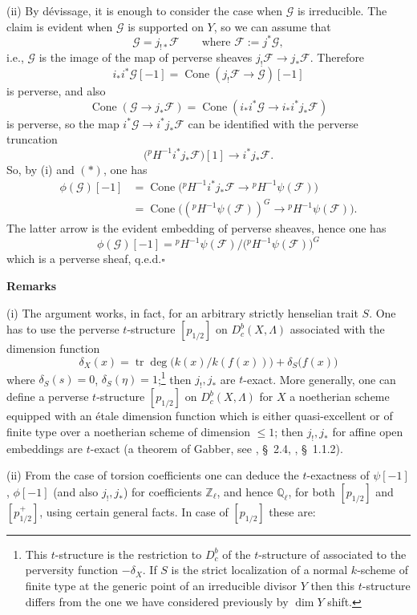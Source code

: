 \documentclass[12pt,oneside]{amsbook}
\theoremstyle{plain}
\theoremstyle{definition}
\newcommand{\FF}{\mathcal{F}}
\newcommand{\GG}{\mathcal{G}}
\newcommand{\Zl}{\mathbb{Z}_{\ell}}
\newcommand{\Ql}{\mathbb{Q}_{\ell}}
\newcommand{\Dbc}{D^{b}_{c}}
\DeclareMathOperator{\dimm}{dim}
\begin{document}
(ii) By dévissage, it is enough to consider the case when $\GG$ is irreducible. The claim is evident when $\GG$ is supported on $Y$, so we can assume that
\[
  \GG=j_{!*}\FF\qquad\text{where }\FF:=j^{*}\GG,
\]
i.e., $\GG$ is the image of the map of perverse sheaves $j_{!}\FF\to j_{*}\FF$. Therefore
\[
  i_{*}i^{*}\GG[-1]=\operatorname{Cone}(j_{!}\FF\to\GG)[-1]
\]
is perverse, and also
\[
  \operatorname{Cone}(\GG\to j_{*}\FF)
    =\operatorname{Cone}(i_{*}i^{*}\GG\to i_{*}i^{*}j_{*}\FF)
\]
is perverse, so the map $i^{*}\GG\to i^{*}j_{*}\FF$ can be identified with the perverse truncation
\[
  \bigl({}^{p}H^{-1}i^{*}j_{*}\FF\bigr)[1]\longrightarrow i^{*}j_{*}\FF .
\]
So, by (i) and $(*)$, one has
\begin{align*}
  \phi(\GG)[-1]
    &=\operatorname{Cone}\bigl({}^{p}H^{-1}i^{*}j_{*}\FF\to{}^{p}H^{-1}\psi(\FF)\bigr)\\
    &=\operatorname{Cone}\bigl(({}^{p}H^{-1}\psi(\FF))^{G}\to{}^{p}H^{-1}\psi(\FF)\bigr).
\end{align*}
The latter arrow is the evident embedding of perverse sheaves, hence one has
\[
  \phi(\GG)[-1]={}^{p}H^{-1}\psi(\FF)\big/\bigl({}^{p}H^{-1}\psi(\FF)\bigr)^{G}
\]
which is a perverse sheaf, q.e.d.\hfill$\square$

\medskip
\noindent\textbf{Remarks}

\smallskip
(i) The argument works, in fact, for an arbitrary strictly henselian trait $S$. One has to use the perverse $t$-structure $[p_{1/2}]$ on $\Dbc(X,\Lambda)$ associated with the dimension function
\[
  \delta_{X}(x)=\operatorname{tr}\deg\bigl(k(x)/k(f(x))\bigr)+\delta_{S}\bigl(f(x)\bigr)
\]
where $\delta_{S}(s)=0$, $\delta_{S}(\eta)=1$;\footnote{This $t$-structure is the restriction to $\Dbc$ of the $t$-structure of \cite{Gab04} associated to the perversity function $-\delta_{X}$. If $S$ is the strict localization of a normal $k$-scheme of finite type at the generic point of an irreducible divisor $Y$ then this $t$-structure differs from the one we have considered previously by $\dimm Y$ shift.} then $j_{!},j_{*}$ are $t$-exact. More generally, one can define a perverse $t$-structure $[p_{1/2}]$ on $\Dbc(X,\Lambda)$ for $X$ a noetherian scheme equipped with an étale dimension function which is either quasi-excellent or of finite type over a noetherian scheme of dimension $\leq1$; then $j_{!},j_{*}$ for affine open embeddings are $t$-exact (a theorem of Gabber, see \cite{Ill03}, \S~2.4, \cite{PS14}, \S~1.1.2).

\smallskip
(ii) From the case of torsion coefficients one can deduce the $t$-exactness of $\psi[-1]$, $\phi[-1]$ (and also $j_{!},j_{*}$) for coefficients $\Zl$, and hence $\Ql$, for both $[p_{1/2}]$ and $[p^{+}_{1/2}]$, using certain general facts. In case of $[p_{1/2}]$ these are:
\end{document}
